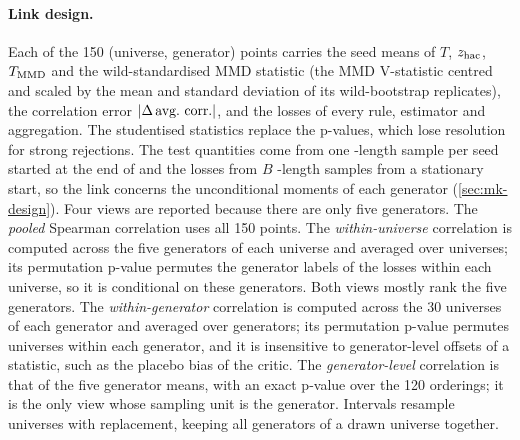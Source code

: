 \paragraph{Link design.}
Each of the 150 (universe, generator) points carries the seed means of $T$, $z_{\mathrm{hac}}$, $T_{\mathrm{MMD}}$ and
the wild-standardised MMD statistic (the MMD V-statistic centred and scaled by the mean and
standard deviation of its wild-bootstrap replicates), the correlation error
$\abs{\Delta\,\text{avg.\ corr.}}$, and the losses of every rule, estimator and aggregation. The
studentised statistics replace the p-values, which lose resolution for strong rejections. The
test quantities come from one \TEST{}-length sample per seed started at the end of \TRAIN{} and
the losses from $B$ \TRAIN{}-length samples from a stationary start, so the link concerns the
unconditional moments of each generator (\cref{sec:mk-design}). Four
views are reported because there are only five generators. The \emph{pooled} Spearman correlation
uses all 150 points. The \emph{within-universe} correlation is computed across the five
generators of each universe and averaged over universes; its permutation p-value permutes the
generator labels of the losses within each universe, so it is conditional on these generators.
Both views mostly rank the five generators. The \emph{within-generator} correlation is computed
across the 30 universes of each generator and averaged over generators; its permutation p-value
permutes universes within each generator, and it is insensitive to generator-level offsets of a
statistic, such as the placebo bias of the critic. The \emph{generator-level} correlation is that of
the five generator means, with an exact p-value over the 120 orderings; it is the only view whose
sampling unit is the generator. Intervals resample universes with replacement, keeping all
generators of a drawn universe together.

